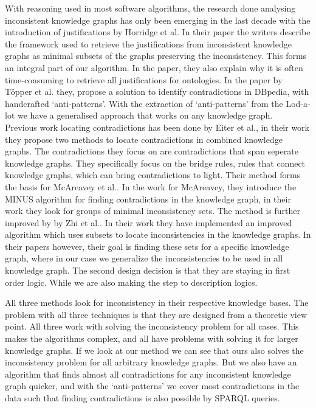\documentclass[11pt,letterpaper ,oneside ]{book}
\begin{document}
With reasoning used in most software algorithms, the research done analysing inconsistent knowledge graphs has only been emerging in the last decade with the introduction of justifications by Horridge et al\cite{Horridge:2009}. In their paper the writers describe the framework used to retrieve the justifications from inconsistent knowledge graphs as minimal subsets of the graphs preserving the inconsistency. This forms an integral part of our algorithm. In the paper, they also explain why it is often time-consuming to retrieve all justifications for ontologies. In the paper by T\"{o}pper et al. \cite{Topper:2012} they, propose a solution to identify contradictions in DBpedia, with handcrafted `anti-patterns'. With the extraction of `anti-patterns' from the Lod-a-lot we have a generalised approach that works on any knowledge graph. \\

Previous work locating contradictions has been done by Eiter et al.\cite{Eiter:2010}, in their work they propose two methods to locate contradictions in combined knowledge graphs. The contradictions they focus on are contradictions that span seperate knowledge graphs. They specifically focus on the bridge rules, rules that connect knowledge graphs, which can bring contradictions to light. Their method forms the basis for McAreavey et al.\cite{McAreavey:2014}. In the work for McAreavey, they introduce the MINUS algorithm for finding contradictions in the knowledge graph, in their work they look for groups of minimal inconsistency sets. The method is further improved by by Zhi et al.\cite{Zhi:2015}. In their work they have implemented an improved algorithm which uses subsets to locate inconsistencies in the knowledge graphs. In their papers however, their goal is finding these sets for a specific knowledge graph, where in our case we generalize the inconsistencies to be used in all knowledge graph. The second design decision is that they are staying in first order logic. While we are also making the step to description logics.

All three methods look for inconsistency in their respective knowledge bases. The problem with all three techniques is that they are designed from a theoretic view point. All three work with solving the inconsistency problem for all cases. This makes the algorithms complex, and all have problems with solving it for larger knowledge graphs. If we look at our method we can see that ours also solves the inconsistency problem for all arbitrary knowledge graphs. But we also have an algorithm that finds almost all contradictions for any inconsistent knowledge graph quicker, and with the `anti-patterns' we cover most contradictions in the data such that finding contradictions is also possible by SPARQL queries.
\end{document}
